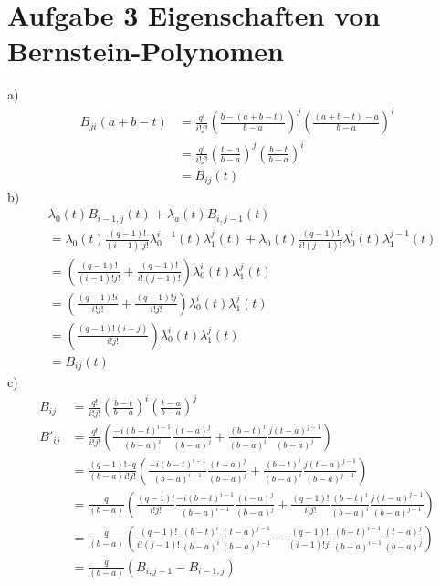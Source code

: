 
\section*{Aufgabe 3 Eigenschaften von Bernstein-Polynomen}
a)
\begin{align}
	B_{ji}(a+b-t) &= \frac{q!}{i!j!} \left(\frac{b-(a+b-t)}{b-a}\right)^j \left(\frac{(a+b-t)-a}{b-a}\right)^i \\
	&= \frac{q!}{i!j!} \left(\frac{t-a}{b-a}\right)^j \left(\frac{b-t}{b-a}\right)^i\\
	&= B_{ij}(t)
\end{align}
b)
\begin{align}
	& \lambda_0(t) B_{i-1,j}(t) + \lambda_a(t) B_{i,j-1}(t)\\
	&= \lambda_0(t) \frac{(q-1)!}{(i-1)!j!} \lambda_0^{i-1}(t) \lambda_1^{j}(t) + \lambda_0(t) \frac{(q-1)!}{i!(j-1)!} \lambda_0^{i}(t) \lambda_1^{j-1}(t)\\
	&= \left(\frac{(q-1)!}{(i-1)!j!} +\frac{(q-1)!}{i!(j-1)!} \right) \lambda_0^i(t)\lambda_1^{j}(t) \\
	&= \left(\frac{(q-1)!i}{i!j!} +\frac{(q-1)!j}{i!j!} \right)  \lambda_0^i(t)\lambda_1^{j}(t)\\
	&= \left(\frac{(q-1)!(i+j)}{i!j!} \right) \lambda_0^i(t)\lambda_1^{j}(t)\\
	&= B_{ij}(t)
\end{align}
c)
\begin{align}
	B_{ij} &= \frac{q!}{i!j!} \left(\frac{b-t}{b-a}\right)^i \left(\frac{t-a}{b-a}\right)^j \\
	B'_{ij} &= \frac{q!}{i!j!} \left(\frac{-i(b-t)^{i-1}}{(b-a)^i} \frac{(t-a)^{j}}{(b-a)^j} + \frac{(b-t)^{i}}{(b-a)^i} \frac{j(t-a)^{j-1}}{(b-a)^j} \right)\\
	&= \frac{(q-1)!\cdot q}{(b-a) i! j!} \left(\frac{-i(b-t)^{i-1}}{(b-a)^{i-1}} \frac{(t-a)^{j}}{(b-a)^j} + \frac{(b-t)^{i}}{(b-a)^i} \frac{j(t-a)^{j-1}}{(b-a)^{j-1}} \right)\\
	&= \frac{q}{(b-a)} \left(\frac{(q-1)!}{i!j!}\frac{-i(b-t)^{i-1}}{(b-a)^{i-1}} \frac{(t-a)^{j}}{(b-a)^j} + \frac{(q-1)!}{i!j!}\frac{(b-t)^{i}}{(b-a)^i} \frac{j(t-a)^{j-1}}{(b-a)^{j-1}} \right)\\
	&= \frac{q}{(b-a)} \left(\frac{(q-1)!}{i!(j-1)!}\frac{(b-t)^{i}}{(b-a)^i} \frac{(t-a)^{j-1}}{(b-a)^{j-1}} - \frac{(q-1)!}{(i-1)!j!}\frac{(b-t)^{i-1}}{(b-a)^{i-1}} \frac{(t-a)^{j}}{(b-a)^j}\right)\\
	&= \frac{q}{(b-a)} \left( B_{i,j-1} - B_{i-1,j} \right) 
\end{align}
